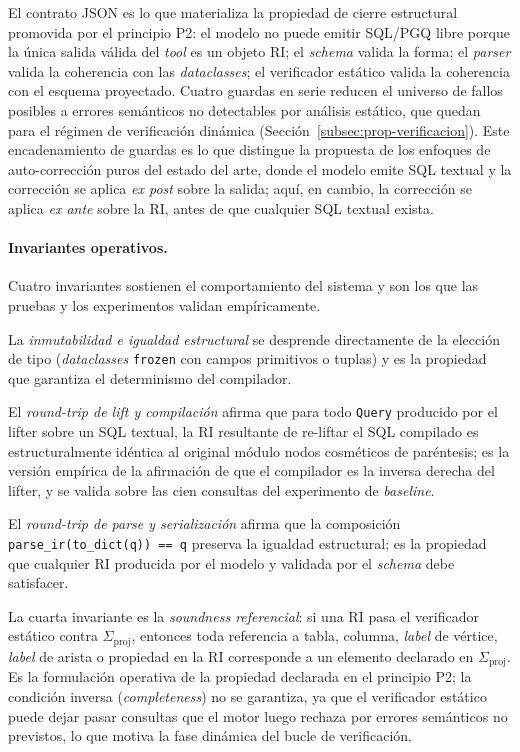 El contrato JSON es lo que materializa la propiedad de cierre estructural promovida por el principio P2: el modelo no puede emitir \ac{SQL}/\ac{PGQ} libre porque la única salida válida del \emph{tool} es un objeto \ac{RI}; el \emph{schema} valida la forma; el \emph{parser} valida la coherencia con las \emph{dataclasses}; el verificador estático valida la coherencia con el esquema proyectado. Cuatro guardas en serie reducen el universo de fallos posibles a errores semánticos no detectables por análisis estático, que quedan para el régimen de verificación dinámica (Sección~\ref{subsec:prop-verificacion}). Este encadenamiento de guardas es lo que distingue la propuesta de los enfoques de auto-corrección puros del estado del arte, donde el modelo emite \ac{SQL} textual y la corrección se aplica \emph{ex post} sobre la salida; aquí, en cambio, la corrección se aplica \emph{ex ante} sobre la \ac{RI}, antes de que cualquier \ac{SQL} textual exista. %

\paragraph{Invariantes operativos.} Cuatro invariantes sostienen el comportamiento del sistema y son los que las pruebas y los experimentos validan empíricamente.

La \emph{inmutabilidad e igualdad estructural} se desprende directamente de la elección de tipo (\emph{dataclasses} \texttt{frozen} con campos primitivos o tuplas) y es la propiedad que garantiza el determinismo del compilador.

El \emph{round-trip de lift y compilación} afirma que para todo \texttt{Query} producido por el lifter sobre un \ac{SQL} textual, la \ac{RI} resultante de re-liftar el \ac{SQL} compilado es estructuralmente idéntica al original módulo nodos cosméticos de paréntesis; es la versión empírica de la afirmación de que el compilador es la inversa derecha del lifter, y se valida sobre las cien consultas del experimento de \emph{baseline}.

El \emph{round-trip de parse y serialización} afirma que la composición \texttt{parse\_ir(to\_dict(q)) == q} preserva la igualdad estructural; es la propiedad que cualquier \ac{RI} producida por el modelo y validada por el \emph{schema} debe satisfacer.

La cuarta invariante es la \emph{soundness referencial}: si una \ac{RI} pasa el verificador estático contra $\Sigma_{\mathrm{proj}}$, entonces toda referencia a tabla, columna, \emph{label} de vértice, \emph{label} de arista o propiedad en la \ac{RI} corresponde a un elemento declarado en $\Sigma_{\mathrm{proj}}$. Es la formulación operativa de la propiedad declarada en el principio P2; la condición inversa (\emph{completeness}) no se garantiza, ya que el verificador estático puede dejar pasar consultas que el motor luego rechaza por errores semánticos no previstos, lo que motiva la fase dinámica del bucle de verificación.



